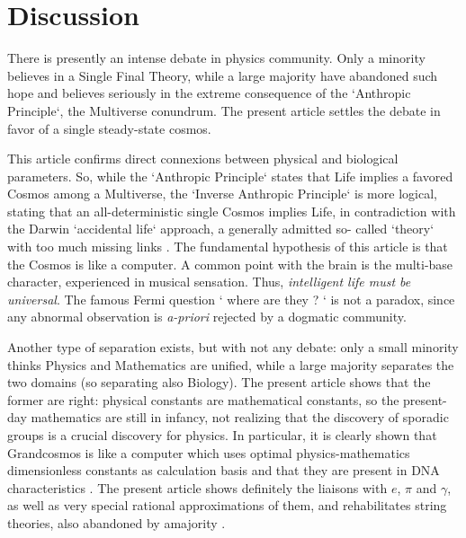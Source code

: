 \documentclass[twoside,draft]{article}
\begin{document}
\begin{sloppypar}
{\section {Discussion}

There is presently an intense debate in physics community. Only a minority believes in a Single
Final Theory, while a large majority have abandoned such hope and believes seriously in the extreme
consequence of the `Anthropic Principle`, the Multiverse conundrum. The present article settles the
debate in favor of a single steady-state cosmos.

This article confirms direct connexions \cite{Sanchez1} between physical and biological parameters. So,
while the `Anthropic Principle` states that Life implies a favored Cosmos among a Multiverse, the
`Inverse Anthropic Principle` \cite{Sanchez1} is more logical, stating that an all-deterministic single Cosmos
implies Life, in contradiction with the Darwin `accidental life` approach, a generally admitted so-
called `theory` with too much missing links \cite{Chauvin}. The fundamental hypothesis of
this article is that the Cosmos is like a computer. A common point with the brain is the multi-base
character, experienced in musical sensation. Thus, \textit{intelligent life must be universal}. The famous Fermi
question ` where are they ? ` is not a paradox, since any abnormal observation is \textit{a-priori} rejected by a
dogmatic community.

Another type of separation exists, but with not any debate: only a small minority thinks Physics
and Mathematics are unified, while a large majority separates the two domains (so separating also
Biology). The present article shows that the former are right: physical constants are mathematical
constants, so the present-day mathematics are still in infancy, not realizing that the discovery of
sporadic groups is a crucial discovery for physics. In particular, it is clearly shown that
Grandcosmos is like a computer which uses optimal physics-mathematics dimensionless constants as
calculation basis and that they are present in DNA characteristics \cite{Sanchez1}. The present article shows
definitely the liaisons with $e$, $\pi$ and $\gamma$, as well as very special rational approximations of 
them, and rehabilitates string theories, also abandoned by amajority \cite{Woit}.

}
\end{sloppypar}
\end{document}
